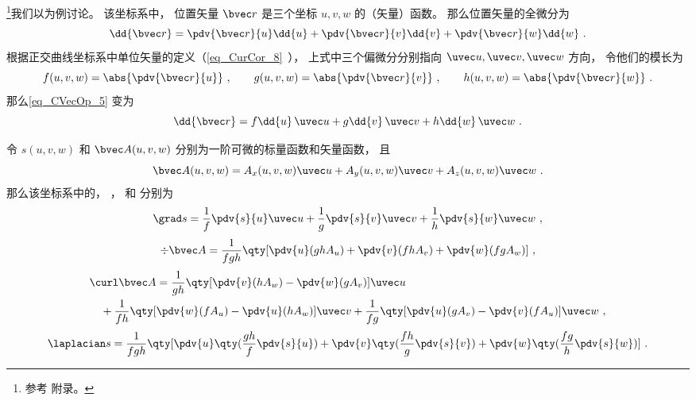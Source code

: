 

\footnote{参考 \cite{GriffE} 附录。}我们以为例讨论。 该坐标系中， 位置矢量 $\bvec r$ 是三个坐标 $u, v, w$ 的（矢量）函数。 那么位置矢量的全微分为
\begin{equation}\label{eq_CVecOp_5}
\dd{\bvec r} = \pdv{\bvec r}{u}\dd{u} + \pdv{\bvec r}{v}\dd{v} + \pdv{\bvec r}{w}\dd{w}~.
\end{equation}
根据正交曲线坐标系中单位矢量的定义（\autoref{eq_CurCor_8}~）， 上式中三个偏微分分别指向 $\uvec u, \uvec v, \uvec w$ 方向， 令他们的模长为
\begin{equation}
f(u,v,w) = \abs{\pdv{\bvec r}{u}}~, \qquad
g(u,v,w) = \abs{\pdv{\bvec r}{v}} ~,\qquad
h(u,v,w) = \abs{\pdv{\bvec r}{w}}~.
\end{equation}
那么\autoref{eq_CVecOp_5} 变为
\begin{equation}\label{eq_CVecOp_4}
\dd{\bvec r} = f\dd{u}\,\uvec u + g\dd{v}\,\uvec v + h\dd{w}\,\uvec w~.
\end{equation}


令 $s(u, v, w)$ 和 $\bvec A(u, v, w)$ 分别为一阶可微的标量函数和矢量函数， 且
\begin{equation}\label{eq_CVecOp_7}
\bvec A(u, v, w) = A_x(u, v, w)\uvec u + A_y(u, v, w)\uvec v + A_z(u, v, w)\uvec w~.
\end{equation}
那么该坐标系中的， ， 和 分别为
\begin{equation}\label{eq_CVecOp_1}
\grad s = \frac{1}{f} \pdv{s}{u}\uvec u + \frac{1}{g}\pdv{s}{v} \uvec v + \frac{1}{h} \pdv{s}{w}\uvec w~,
\end{equation}
\begin{equation}\label{eq_CVecOp_2}
\div \bvec A = \frac{1}{fgh}\qty[\pdv{u}(ghA_u) + \pdv{v}(fhA_v) + \pdv{w}(fgA_w)]~,
\end{equation}
\begin{equation}\label{eq_CVecOp_3}
\begin{aligned}
&\curl \bvec A = \frac{1}{gh}\qty[\pdv{v}(hA_w) - \pdv{w}(gA_v)]\uvec u\\
&\quad + \frac{1}{fh}\qty[\pdv{w}(fA_u) - \pdv{u}(hA_w)]\uvec v
+ \frac{1}{fg}\qty[\pdv{u}(gA_v) - \pdv{v}(fA_u)]\uvec w~,
\end{aligned}
\end{equation}
\begin{equation}\label{eq_CVecOp_6}
\laplacian s = \frac{1}{fgh}\qty[\pdv{u}\qty(\frac{gh}{f}\pdv{s}{u}) + \pdv{v}\qty(\frac{fh}{g}\pdv{s}{v}) + \pdv{w}\qty(\frac{fg}{h}\pdv{s}{w})]~.
\end{equation}

